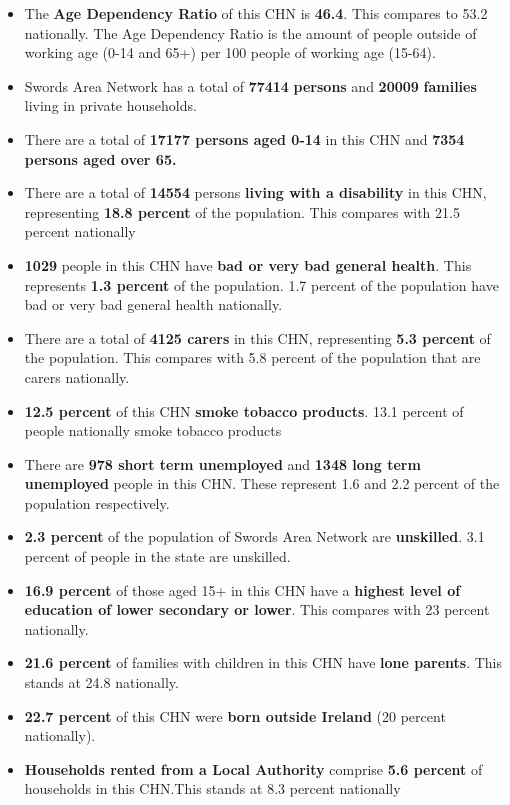 \documentclass{article}
\begin{document}
\begin{itemize}

\item The \textbf{Age Dependency Ratio} of this CHN is  \textbf{46.4}. This compares to 53.2 nationally. The Age Dependency Ratio is the amount of people outside of working age (0-14 and 65+) per 100 people of working age (15-64). 

\item Swords Area Network has a total of \textbf{\num{77414}} \textbf{persons} and  \textbf{\num{20009}} \textbf{families} living in private households.

\item There are a total of \textbf{\num{17177} persons aged 0-14} in this CHN and \textbf{\num{7354} persons aged over 65.} 

\item There are a total of \textbf{\num{14554}} persons \textbf{living with a disability} in this CHN, representing \textbf{18.8 percent} of the population. This compares with  21.5 percent nationally

\item \textbf{\num{1029}} people in this CHN have \textbf{bad or very bad general health}. This represents \textbf{1.3 percent} of the population. 1.7 percent of the population have bad or very bad general health nationally. 

\item There are a total of \textbf{\num{4125} carers} in this CHN, representing \textbf{5.3 percent} of the population. This compares with 5.8 percent of the population that are carers nationally. 

\item \textbf{12.5 percent} of this CHN \textbf{smoke tobacco products}. 13.1 percent of people nationally smoke tobacco products

\item There are \textbf{\num{978} short term unemployed} and \textbf{\num{1348} long term unemployed} people in this CHN. These represent 1.6 and 2.2 percent of the population respectively.

\item  \textbf{2.3 percent} of the population of Swords Area Network are \textbf{unskilled}. 3.1 percent of people in the state are unskilled.

\item \textbf{16.9 percent} of those aged 15+ in this CHN have a \textbf{highest level of education of lower secondary or lower}. This compares with 23 percent nationally. 

\item \textbf{21.6 percent} of families with children in this CHN have \textbf{lone parents}. This stands at 24.8 nationally.

\item \textbf{22.7 percent} of this CHN were \textbf{born outside Ireland} (20 percent nationally).

\item \textbf{Households rented from a Local Authority} comprise \textbf{5.6 percent} of households in this CHN.This stands at 8.3 percent nationally

\end{itemize}
\end{document}
